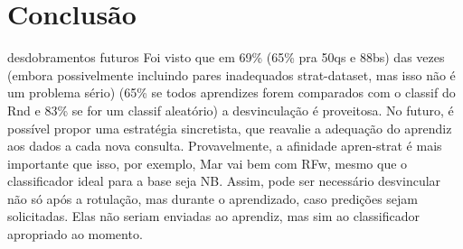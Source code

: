 \chapter{Conclusão}\label{conclusao}


desdobramentos futuros
Foi visto que em 69\% (65\% pra 50qs e 88bs) das vezes
(embora possivelmente incluindo pares inadequados strat-dataset,
mas isso não é um problema sério) (65\% se todos aprendizes forem comparados com o classif do Rnd e 83\%
se for um classif aleatório)
a desvinculação é proveitosa.
No futuro, é possível propor uma estratégia sincretista, que reavalie a adequação do aprendiz
aos dados a cada nova consulta.
Provavelmente, a afinidade apren-strat é mais importante que isso,
por exemplo, Mar vai bem com RFw, mesmo que o classificador ideal para a base seja NB.
Assim, pode ser necessário desvincular não só após a rotulação, mas durante o aprendizado,
caso predições sejam solicitadas. Elas não seriam enviadas ao aprendiz, mas sim ao
classificador apropriado ao momento.
